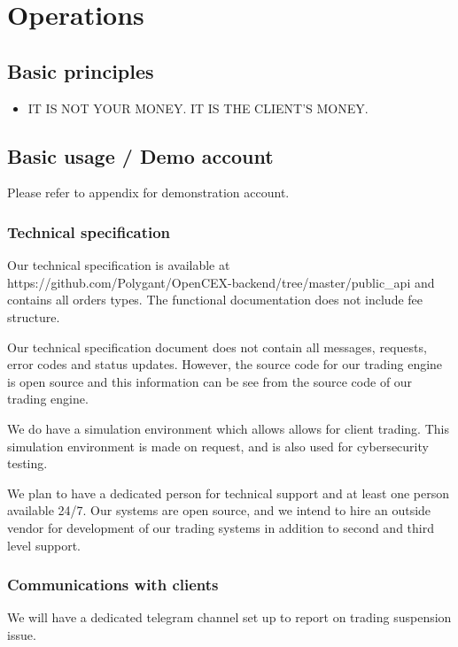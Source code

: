 \chapter{Operations}

\section{Basic principles}

\begin{itemize}
\item IT IS NOT YOUR MONEY.  IT IS THE CLIENT'S MONEY.
\end{itemize}

\section{Basic usage / Demo account}
Please refer to appendix for demonstration account.

\subsection{Technical specification}
Our technical specification is available at
https://github.com/Polygant/OpenCEX-backend/tree/master/public\_api
and contains all orders types.  The functional documentation does not
include fee structure.

Our technical specification document does not contain all messages,
requests, error codes and status updates.  However, the source code
for our trading engine is open source and this information can be see
from the source code of our trading engine.

We do have a simulation environment which allows allows for client
trading.  This simulation environment is made on request, and is also
used for cybersecurity testing.

We plan to have a dedicated person for technical support and at least
one person available 24/7.  Our systems are open source, and we intend
to hire an outside vendor for development of our trading systems in
addition to second and third level support.

\subsection{Communications with clients}
We will have a dedicated telegram channel set up to report on trading
suspension issue.

